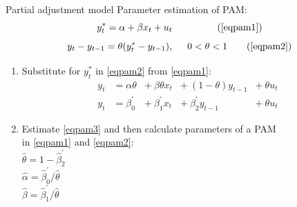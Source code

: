 \documentclass{beamer}
\begin{document}
\begin{frame}{Partial adjustment model}
Parameter estimation of PAM:
\begin{equation*}
{y}_t^\ast = \alpha + \beta x_t + u_t ~~~~~~~~ \tag{\ref{eqpam1}}
\end{equation*}
\vspace{-0.6cm}
\begin{equation*}
y_t - y_{t-1} = \theta ( y_t^\ast-y_{t-1}), \hspace{0.5cm} 0 < \theta < 1 \tag{\ref{eqpam2}}
\end{equation*}

\begin{enumerate}
\item Substitute for $y_t^\ast$ in \eqref{eqpam2} from \eqref{eqpam1}:\\
\begin{equation}
\begin{aligned}
y_t &= \alpha \theta &+~ \beta \theta x_t &+~ (1-\theta) y_{t-1} &+~ \theta u_t \label{eqpam3}\\
y_t &= \beta_0^{\prime} &+~ \beta_1^{\prime} x_t &+~ \beta_2^{\prime} y_{t-1} &+~ \theta u_t
\end{aligned}
\end{equation}
\item Estimate \eqref{eqpam3} and then calculate parameters of a PAM \\in \eqref{eqpam1} and \eqref{eqpam2}:\\
\smallskip
$\hat{\theta}= 1-\hat{\beta}_2^{\prime}$\\
\smallskip
$\hat{\alpha} =\hat{\beta}_0^{\prime}/\hat{\theta}$\\
\smallskip
$\hat{\beta} =\hat{\beta}_1^{\prime}/\hat{\theta}$
\end{enumerate}
\end{frame}

\end{document}
